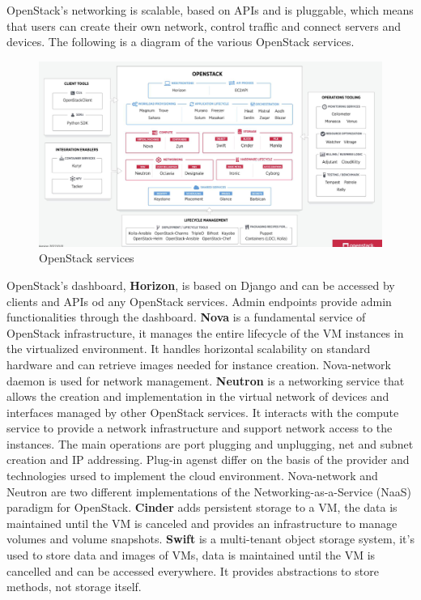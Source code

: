 OpenStack's networking is scalable, based on APIs and is pluggable, which means that users can create their own network, control traffic and connect servers and devices. \n
The following is a diagram of the various OpenStack services.
\begin{figure}
    \centering
    \includegraphics[scale=0.4]{img/OpenStack_Services.png}
    \caption{OpenStack services}
\end{figure}
OpenStack's dashboard, \textbf{Horizon}, is based on Django and can be accessed by clients and APIs od any OpenStack services. Admin endpoints provide admin functionalities through the dashboard. \n
\textbf{Nova} is a fundamental service of OpenStack infrastructure, it manages the entire lifecycle of the VM instances in the virtualized environment. It handles horizontal scalability on standard hardware and can retrieve images needed for instance creation. Nova-network daemon is used for network management. \n
\textbf{Neutron} is a networking service that allows the creation and implementation in the virtual network of devices and interfaces managed by other OpenStack services. It interacts with the compute service to provide a network infrastructure and support network access to the instances. \n
The main operations are port plugging and unplugging, net and subnet creation and IP addressing. Plug-in agenst differ on the basis of the provider and technologies ursed to implement the cloud environment. Nova-network and Neutron are two different implementations of the Networking-as-a-Service (NaaS) paradigm for OpenStack. \n
\textbf{Cinder} adds persistent storage to a VM, the data is maintained until the VM is canceled and provides an infrastructure to manage volumes and volume snapshots. \n
\textbf{Swift} is a multi-tenant object storage system, it's used to store data and images of VMs, data is maintained until the VM is cancelled and can be accessed everywhere. It provides abstractions to store methods, not storage itself. \n
